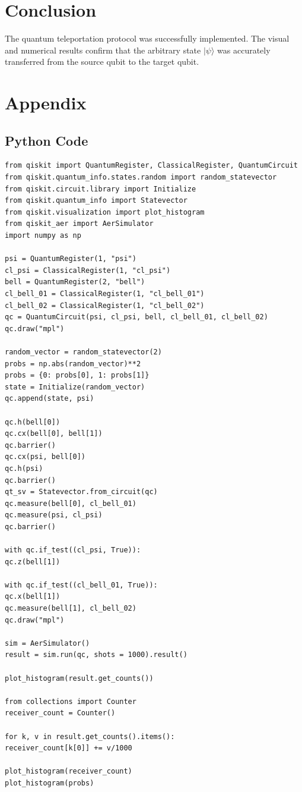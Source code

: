 \documentclass[12pt]{article}
\begin{document}
\section{Conclusion}
The quantum teleportation protocol was successfully implemented. The visual and numerical results confirm that the arbitrary state \(|\psi\rangle\) was accurately transferred from the source qubit to the target qubit.

\newpage
\section{Appendix}
\subsection{Python Code}
\begin{verbatim}
from qiskit import QuantumRegister, ClassicalRegister, QuantumCircuit
from qiskit.quantum_info.states.random import random_statevector
from qiskit.circuit.library import Initialize
from qiskit.quantum_info import Statevector
from qiskit.visualization import plot_histogram
from qiskit_aer import AerSimulator
import numpy as np

psi = QuantumRegister(1, "psi")
cl_psi = ClassicalRegister(1, "cl_psi")
bell = QuantumRegister(2, "bell")
cl_bell_01 = ClassicalRegister(1, "cl_bell_01")
cl_bell_02 = ClassicalRegister(1, "cl_bell_02")
qc = QuantumCircuit(psi, cl_psi, bell, cl_bell_01, cl_bell_02)
qc.draw("mpl")

random_vector = random_statevector(2)
probs = np.abs(random_vector)**2
probs = {0: probs[0], 1: probs[1]}
state = Initialize(random_vector)
qc.append(state, psi)

qc.h(bell[0])
qc.cx(bell[0], bell[1])
qc.barrier()
qc.cx(psi, bell[0])
qc.h(psi)
qc.barrier()
qt_sv = Statevector.from_circuit(qc)
qc.measure(bell[0], cl_bell_01)
qc.measure(psi, cl_psi)
qc.barrier()

with qc.if_test((cl_psi, True)):
qc.z(bell[1])

with qc.if_test((cl_bell_01, True)):
qc.x(bell[1])
qc.measure(bell[1], cl_bell_02)
qc.draw("mpl")

sim = AerSimulator()
result = sim.run(qc, shots = 1000).result()

plot_histogram(result.get_counts())

from collections import Counter
receiver_count = Counter()

for k, v in result.get_counts().items():
receiver_count[k[0]] += v/1000

plot_histogram(receiver_count)
plot_histogram(probs)
\end{verbatim}
\end{document}
